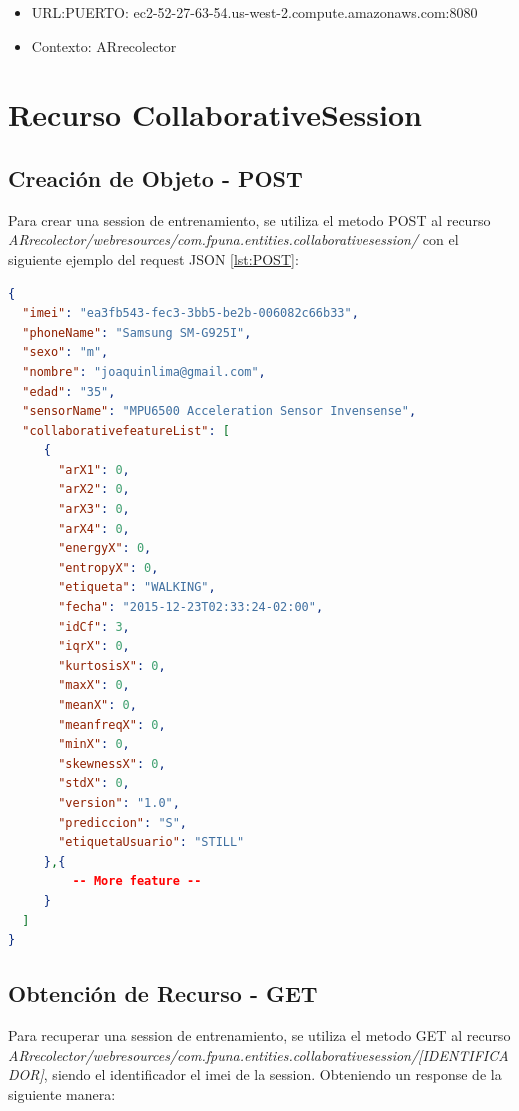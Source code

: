 \begin{itemize}
	\item URL:PUERTO: ec2-52-27-63-54.us-west-2.compute.amazonaws.com:8080
	\item Contexto: ARrecolector
\end{itemize}



\section{Recurso CollaborativeSession}

\subsection{Creación de Objeto - POST}

Para crear una session de entrenamiento, se utiliza el metodo POST al recurso \textit{ARrecolector/webresources/com.fpuna.entities.collaborativesession/} con el siguiente ejemplo del request JSON \ref{lst:POST}:

\begin{lstlisting}[language=json,firstnumber=1,label={lst:POST}]
{
  "imei": "ea3fb543-fec3-3bb5-be2b-006082c66b33",
  "phoneName": "Samsung SM-G925I",
  "sexo": "m",
  "nombre": "joaquinlima@gmail.com",
  "edad": "35",
  "sensorName": "MPU6500 Acceleration Sensor Invensense",
  "collaborativefeatureList": [
     {
       "arX1": 0,
       "arX2": 0,
       "arX3": 0,
       "arX4": 0,
       "energyX": 0,
       "entropyX": 0,
       "etiqueta": "WALKING",
       "fecha": "2015-12-23T02:33:24-02:00",
       "idCf": 3,
       "iqrX": 0,
       "kurtosisX": 0,
       "maxX": 0,
       "meanX": 0,
       "meanfreqX": 0,
       "minX": 0,
       "skewnessX": 0,
       "stdX": 0,
       "version": "1.0",
       "prediccion": "S",
       "etiquetaUsuario": "STILL"
     },{ 
	     -- More feature -- 
     }  
  ]
}
\end{lstlisting}

\subsection{Obtención de Recurso - GET}

Para recuperar una session de entrenamiento, se utiliza el metodo GET al recurso \textit{ARrecolector/webresources/com.fpuna.entities.collaborativesession/[IDENTIFICADOR]}, siendo el identificador el imei de la session. Obteniendo un response de la siguiente manera:

